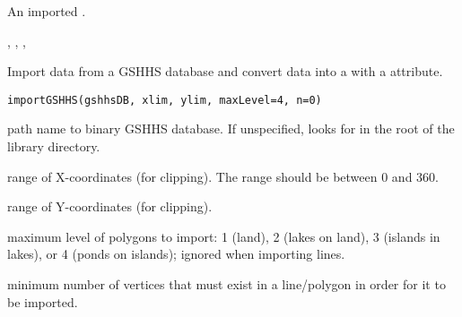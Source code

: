\documentclass[letterpaper]{book}
\begin{document}
%
\begin{Value}
An imported .
\end{Value}
%
\begin{SeeAlso}\relax
{}, , , 
\end{SeeAlso}
%
\begin{Description}\relax
Import data from a GSHHS database and convert data into a 
with a  attribute.
\end{Description}
%
\begin{Usage}
\begin{verbatim}
importGSHHS(gshhsDB, xlim, ylim, maxLevel=4, n=0)
\end{verbatim}
\end{Usage}
%
\begin{Arguments}
\begin{ldescription}
\item[\code{gshhsDB}] path name to binary GSHHS database. If unspecified,
looks for  in the root of the  library
directory.
\item[\code{xlim}] range of X-coordinates (for clipping).
The range should be between 0 and 360.
\item[\code{ylim}] range of Y-coordinates (for clipping).
\item[\code{maxLevel}] maximum level of polygons to import:
1 (land), 2 (lakes on land), 3 (islands in lakes), or 4 (ponds on
islands); ignored when importing lines.
\item[\code{n}] minimum number of vertices that must exist in a line/polygon
in order for it to be imported.
\end{ldescription}
\end{Arguments}
%
\end{document}
